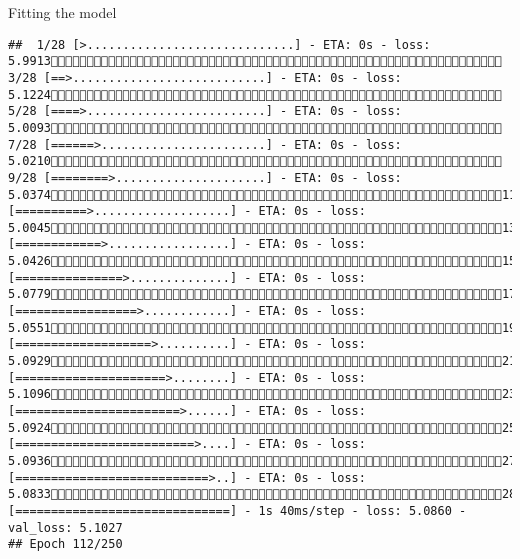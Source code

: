 \documentclass[
  ignorenonframetext,
]{beamer}
\begin{document}
\begin{frame}[fragile]{Fitting the model}
\begin{verbatim}
##  1/28 [>.............................] - ETA: 0s - loss: 5.9913 3/28 [==>...........................] - ETA: 0s - loss: 5.1224 5/28 [====>.........................] - ETA: 0s - loss: 5.0093 7/28 [======>.......................] - ETA: 0s - loss: 5.0210 9/28 [========>.....................] - ETA: 0s - loss: 5.037411/28 [==========>...................] - ETA: 0s - loss: 5.004513/28 [============>.................] - ETA: 0s - loss: 5.042615/28 [===============>..............] - ETA: 0s - loss: 5.077917/28 [=================>............] - ETA: 0s - loss: 5.055119/28 [===================>..........] - ETA: 0s - loss: 5.092921/28 [=====================>........] - ETA: 0s - loss: 5.109623/28 [=======================>......] - ETA: 0s - loss: 5.092425/28 [=========================>....] - ETA: 0s - loss: 5.093627/28 [===========================>..] - ETA: 0s - loss: 5.083328/28 [==============================] - 1s 40ms/step - loss: 5.0860 - val_loss: 5.1027
## Epoch 112/250

\end{verbatim}
\end{frame}
\end{document}
